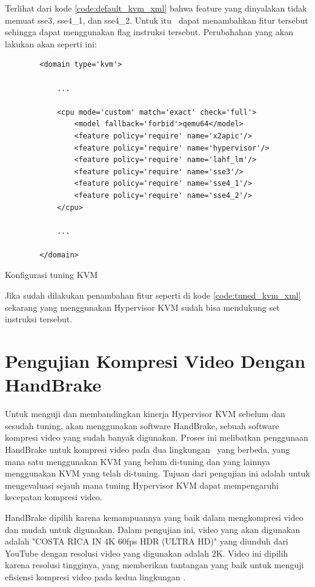 Terlihat dari kode \ref{code:default_kvm_xml} bahwa feature yang dinyalakan tidak memuat sse3, sse4\_1, dan sse4\_2. Untuk itu \saya\ dapat menambahkan fitur tersebut sehingga \vm dapat menggunakan flag instruksi tersebut. Perubahahan yang akan \saya lakukan akan seperti ini:

\begin{listing}[H]
    \begin{verbatim}
        <domain type='kvm'>
        
            ...
            
            <cpu mode='custom' match='exact' check='full'>
                <model fallback='forbid'>qemu64</model>
                <feature policy='require' name='x2apic'/>
                <feature policy='require' name='hypervisor'/>
                <feature policy='require' name='lahf_lm'/>
                <feature policy='require' name='sse3'/>
                <feature policy='require' name='sse4_1'/>
                <feature policy='require' name='sse4_2'/>
            </cpu>
            
            ...
            
        </domain>
    \end{verbatim}
    \caption{Konfigurasi tuning KVM}
    \label{code:tuned_kvm_xml}
\end{listing}

Jika sudah dilakukan penambahan fitur seperti di kode \ref{code:tuned_kvm_xml} sekarang \vm yang menggunakan Hypervisor KVM sudah bisa mendukung set instruksi tersebut.

\section{Pengujian Kompresi Video Dengan HandBrake}
Untuk menguji dan membandingkan kinerja Hypervisor KVM sebelum dan sesudah tuning, {\saya} akan menggunakan software HandBrake, sebuah software kompresi video yang sudah banyak digunakan. Proses ini melibatkan penggunaan HandBrake untuk kompresi video pada dua lingkungan \vm\ yang berbeda, yang mana satu menggunakan KVM yang belum di-tuning dan yang lainnya menggunakan KVM yang telah di-tuning. Tujuan dari pengujian ini adalah untuk mengevaluasi sejauh mana tuning Hypervisor KVM dapat mempengaruhi kecepatan kompresi video.

HandBrake dipilih karena kemampuannya yang baik dalam mengkompresi video dan mudah untuk digunakan\cite{Folgar2014eg}. Dalam pengujian ini, video yang akan digunakan adalah "COSTA RICA IN 4K 60fps HDR (ULTRA HD)" yang diunduh dari YouTube dengan resolusi video yang digunakan adalah 2K. Video ini dipilih karena resolusi tingginya, yang memberikan tantangan yang baik untuk menguji efisiensi kompresi video pada kedua lingkungan \vm. 

